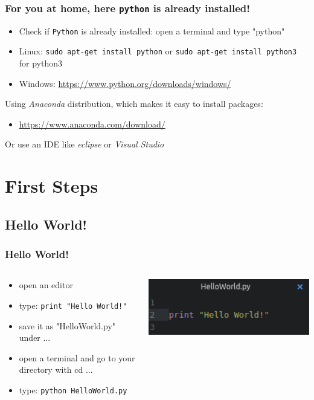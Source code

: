 \documentclass{beamer}
\begin{document}
\begin{frame}
\frametitle{For you at home, here \texttt{python} is already installed!}
	\begin{itemize}
		\item Check if \texttt{Python} is already installed: open a terminal and type "python"
		\item Linux: \texttt{sudo apt-get install python} or \texttt{sudo apt-get install python3} for python3
		\item Windows: \url{https://www.python.org/downloads/windows/}
	\end{itemize}
	Using \textit{Anaconda} distribution, which makes it easy to install packages:
	\begin{itemize}
		\item \url{https://www.anaconda.com/download/}
	\end{itemize}
	Or use an IDE like \textit{eclipse} or \textit{Visual Studio}
\end{frame}

\section{First Steps}
\subsection{Hello World!}

\begin{frame}
\frametitle{ Hello World!}
	\begin{columns}[T]
		\begin{column}[T]{7cm}
			\begin{itemize}
				\item open an editor 
				\item type: \texttt{print "Hello World!"}
				\item save it as "HelloWorld.py" under ...
				\item open a terminal and go to your directory with cd ...
				\item type: \texttt{python HelloWorld.py}
			\end{itemize}
		\end{column}
		\begin{column}[T]{5cm}
			\includegraphics[width = 1\textwidth]{HelloWorld.pdf}
		\end{column}
	\end{columns}
\end{frame}
\end{document}
